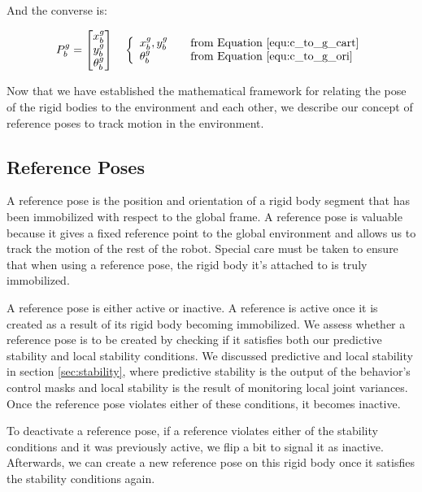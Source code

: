 And the converse is:


\begin{equation}
P_b^g =
\begin{bmatrix}
x_b^g \\
y_b^g \\
\theta_b^g 
\end{bmatrix}
\quad
\left\{ 
  \begin{array}{l l}
    x_b^g,y_b^g & \quad \text{from Equation \ref{equ:c_to_g_cart}}\\
    \theta_b^g & \quad \text{from Equation \ref{equ:c_to_g_ori}}
  \end{array} \right.
\end{equation}


Now that we have established the mathematical framework for relating the pose of the rigid bodies to the environment and each other, we describe our concept of reference poses to track motion in the environment.

\subsection{Reference Poses}
\label{referenceposes}

A reference pose is the position and orientation of a rigid body segment that has been immobilized with respect to the global frame. A reference pose is valuable because it gives a fixed reference point to the global environment and allows us to track the motion of the rest of the robot. Special care must be taken to ensure that when using a reference pose, the rigid body it's attached to is truly immobilized.

A reference pose is either active or inactive. A reference is active once it is created as a result of its rigid body becoming immobilized. We assess whether a reference pose is to be created by checking if it satisfies both our predictive stability and local stability conditions. We discussed predictive and local stability in section \autoref{sec:stability}, where predictive stability is the output of the behavior's control masks and local stability is the result of monitoring local joint variances. Once the reference pose violates either of these conditions, it becomes inactive.

To deactivate a reference pose, if a reference violates either of the stability conditions and it was previously active, we flip a bit to signal it as inactive. Afterwards, we can create a new reference pose on this rigid body once it satisfies the stability conditions again.

